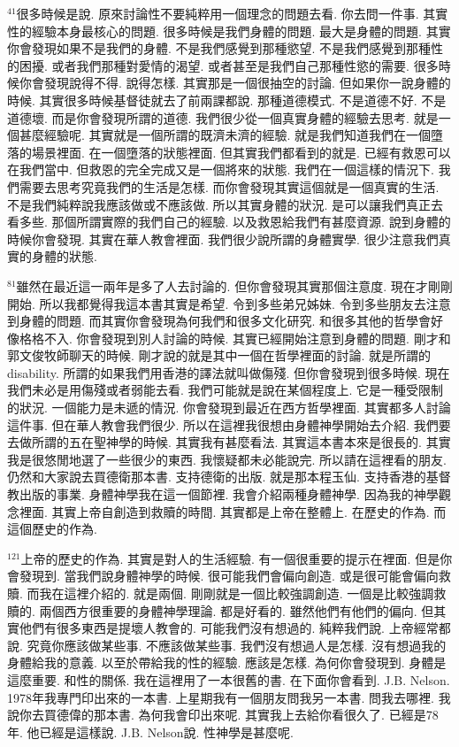 \documentclass{book}
\begin{document}
$^{41}$很多時候是說.
原來討論性不要純粹用一個理念的問題去看.
你去問一件事.
其實性的經驗本身最核心的問題.
很多時候是我們身體的問題.
最大是身體的問題.
其實你會發現如果不是我們的身體.
不是我們感覺到那種慾望.
不是我們感覺到那種性的困擾.
或者我們那種對愛情的渴望.
或者甚至是我們自己那種性慾的需要.
很多時候你會發現說得不得.
說得怎樣.
其實那是一個很抽空的討論.
但如果你一說身體的時候.
其實很多時候基督徒就去了前兩課都說.
那種道德模式.
不是道德不好.
不是道德壞.
而是你會發現所謂的道德.
我們很少從一個真實身體的經驗去思考.
就是一個甚麼經驗呢.
其實就是一個所謂的既濟未濟的經驗.
就是我們知道我們在一個墮落的場景裡面.
在一個墮落的狀態裡面.
但其實我們都看到的就是.
已經有救恩可以在我們當中.
但救恩的完全完成又是一個將來的狀態.
我們在一個這樣的情況下.
我們需要去思考究竟我們的生活是怎樣.
而你會發現其實這個就是一個真實的生活.
不是我們純粹說我應該做或不應該做.
所以其實身體的狀況.
是可以讓我們真正去看多些.
那個所謂實際的我們自己的經驗.
以及救恩給我們有甚麼資源.
說到身體的時候你會發現.
其實在華人教會裡面.
我們很少說所謂的身體實學.
很少注意我們真實的身體的狀態.

$^{81}$雖然在最近這一兩年是多了人去討論的.
但你會發現其實那個注意度.
現在才剛剛開始.
所以我都覺得我這本書其實是希望.
令到多些弟兄姊妹.
令到多些朋友去注意到身體的問題.
而其實你會發現為何我們和很多文化研究.
和很多其他的哲學會好像格格不入.
你會發現到別人討論的時候.
其實已經開始注意到身體的問題.
剛才和郭文俊牧師聊天的時候.
剛才說的就是其中一個在哲學裡面的討論.
就是所謂的disability.
所謂的如果我們用香港的譯法就叫做傷殘.
但你會發現到很多時候.
現在我們未必是用傷殘或者弱能去看.
我們可能就是說在某個程度上.
它是一種受限制的狀況.
一個能力是未遞的情況.
你會發現到最近在西方哲學裡面.
其實都多人討論這件事.
但在華人教會我們很少.
所以在這裡我很想由身體神學開始去介紹.
我們要去做所謂的五在聖神學的時候.
其實我有甚麼看法.
其實這本書本來是很長的.
其實我是很悠閒地選了一些很少的東西.
我懷疑都未必能說完.
所以請在這裡看的朋友.
仍然和大家說去買德衛那本書.
支持德衛的出版.
就是那本程玉仙.
支持香港的基督教出版的事業.
身體神學我在這一個節裡.
我會介紹兩種身體神學.
因為我的神學觀念裡面.
其實上帝自創造到救贖的時間.
其實都是上帝在整體上.
在歷史的作為.
而這個歷史的作為.

$^{121}$上帝的歷史的作為.
其實是對人的生活經驗.
有一個很重要的提示在裡面.
但是你會發現到.
當我們說身體神學的時候.
很可能我們會偏向創造.
或是很可能會偏向救贖.
而我在這裡介紹的.
就是兩個.
剛剛就是一個比較強調創造.
一個是比較強調救贖的.
兩個西方很重要的身體神學理論.
都是好看的.
雖然他們有他們的偏向.
但其實他們有很多東西是提壞人教會的.
可能我們沒有想過的.
純粹我們說.
上帝經常都說.
究竟你應該做某些事.
不應該做某些事.
我們沒有想過人是怎樣.
沒有想過我的身體給我的意義.
以至於帶給我的性的經驗.
應該是怎樣.
為何你會發現到.
身體是這麼重要.
和性的關係.
我在這裡用了一本很舊的書.
在下面你會看到.
J.B. Nelson.
1978年我專門印出來的一本書.
上星期我有一個朋友問我另一本書.
問我去哪裡.
我說你去買德偉的那本書.
為何我會印出來呢.
其實我上去給你看很久了.
已經是78年.
他已經是這樣說.
J.B. Nelson說.
性神學是甚麼呢.
\end{document}
